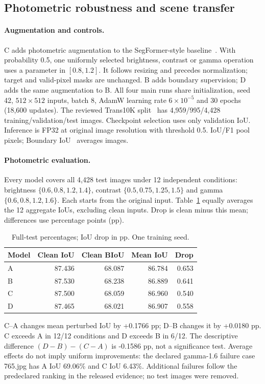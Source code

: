 \subsection{Photometric robustness and scene transfer}
\paragraph{Augmentation and controls.}
C adds photometric augmentation to the SegFormer-style baseline~\cite{xie2021segformer}.
With probability 0.5, one uniformly selected brightness, contrast or gamma operation
uses a parameter in $[0.8,1.2]$. It follows resizing and precedes normalization;
target and valid-pixel masks are unchanged. B adds boundary supervision; D adds
the same augmentation to B. All four main runs share initialization, seed 42,
$512\times512$ inputs, batch 8, AdamW learning rate $6\times10^{-5}$ and 30 epochs
(18,600 updates). The reviewed Trans10K split~\cite{xie2020transparent} has
4,959/995/4,428 training/validation/test images. Checkpoint selection uses only
validation IoU. Inference is FP32 at original image resolution with threshold 0.5.
IoU/F1 pool pixels; Boundary IoU~\cite{cheng2021boundary} averages images.

\paragraph{Photometric evaluation.}
Every model covers all 4,428 test images under 12 independent conditions:
brightness $\{0.6,0.8,1.2,1.4\}$, contrast $\{0.5,0.75,1.25,1.5\}$ and gamma
$\{0.6,0.8,1.2,1.6\}$. Each starts from the original input. Table~\ref{tab:m4-final-robust}
equally averages the 12 aggregate IoUs, excluding clean inputs. Drop is clean minus
this mean; differences use percentage points (pp).
\begin{table}[t]
\centering\small\setlength{\tabcolsep}{3pt}
\begin{tabular}{lrrrr}
\toprule
Model & Clean IoU & Clean BIoU & Mean IoU & Drop\\
\midrule
A & 87.436 & 68.087 & 86.784 & 0.653 \\
B & 87.530 & 68.238 & 86.889 & 0.641 \\
C & 87.500 & 68.059 & 86.960 & 0.540 \\
D & 87.465 & 68.021 & 86.907 & 0.558 \\
\bottomrule
\end{tabular}
\caption{Full-test percentages; IoU drop in pp. One training seed.}
\label{tab:m4-final-robust}
\end{table}
C--A changes mean perturbed IoU by +0.1766 pp; D--B changes it by +0.0180 pp.
C exceeds A in 12/12 conditions and D exceeds B in 6/12.
The descriptive difference $(D-B)-(C-A)$ is -0.1586 pp, not a significance
test. Average effects do not imply uniform improvements: the declared gamma-1.6
failure case 765.jpg has A IoU 69.06\% and C IoU 6.43\%. Additional failures follow
the predeclared ranking in the released evidence; no test images were removed.

